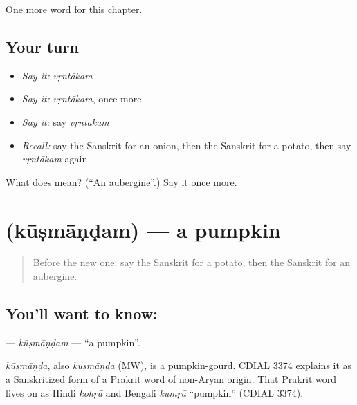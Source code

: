 \begin{grammarlens}[title={What you've built}]
One more word for this chapter.
\end{grammarlens}

\subsection*{Your turn}
\begin{itemize}
\raggedright
  \item \emph{Say it:} \emph{vṛntākam}
  \item \emph{Say it:} \emph{vṛntākam}, once more
  \item \emph{Say it:} say \emph{vṛntākam}
  \item \emph{Recall:} say the Sanskrit for an onion, then the Sanskrit for a potato, then say \emph{vṛntākam} again
\end{itemize}

\begin{tcolorbox}[breakable,colback=teal!4,colframe=teal!35!black,title={Before you move on}]
What does  mean? (\textquotedblleft{}An aubergine\textquotedblright{}.) Say it once more.
\end{tcolorbox}
\section[\texorpdfstring{\sk{कूष्माण्डम्} (kūṣmāṇḍam)}{कूष्माण्डम् (kūṣmāṇḍam)}]{ (kūṣmāṇḍam) — a pumpkin}

\label{lesson:SA-C108-kusmandam}



\begin{quote}
Before the new one: say the Sanskrit for a potato, then the Sanskrit for an aubergine.
\end{quote}

\subsection*{You'll want to know: }
\textbf{} — \emph{kūṣmāṇḍam} — \textquotedblleft{}a pumpkin\textquotedblright{}.

\begin{cousinweb}
\emph{kūṣmāṇḍa}, also \emph{kuṣmāṇḍa} (MW), is a pumpkin-gourd. CDIAL 3374 explains it as a Sanskritized form of a Prakrit word of non-Aryan origin. That Prakrit word lives on as Hindi \emph{kohṛā} and Bengali \emph{kumṛā} \textquotedblleft{}pumpkin\textquotedblright{} (CDIAL 3374).
\end{cousinweb}

